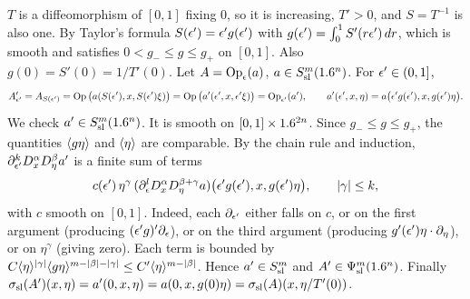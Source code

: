 \subsection*{}
$T$ is a diffeomorphism of $[0,1]$ fixing $0$, so it is increasing, $T'>0$, and
$S=T^{-1}$ is also one. By Taylor's formula $S(\epsilon')=\epsilon'g(\epsilon')$ with
$g(\epsilon')=\int_0^1S'(r\epsilon')\,dr$, which is smooth and satisfies $0<g_-\le g\le g_+$ on $[0,1]$. Also
$g(0)=S'(0)=1/T'(0)$. Let $A=\operatorname{Op}_\epsilon(a)$, $a\in S^{m}_{\mathrm{sl}}(1.6^n)$. For $\epsilon'\in(0,1]$,
\begin{equation*}
A'_{\epsilon'}=A_{S(\epsilon')}=\operatorname{Op}\big(a(S(\epsilon'),x,S(\epsilon')\xi)\big)=\operatorname{Op}\big(a'(\epsilon',x,\epsilon'\xi)\big)=\operatorname{Op}_{\epsilon'}(a'),\qquad
a'(\epsilon',x,\eta)=a\big(\epsilon'g(\epsilon'),x,g(\epsilon')\eta\big).
\end{equation*}
We check $a'\in S^{m}_{\mathrm{sl}}(1.6^n)$. It is smooth on $[0,1]\times1.6^{2n}$. Since $g_-\le g\le g_+$, the
quantities $\langle g\eta\rangle$ and $\langle \eta\rangle$ are comparable. By the chain rule and induction,
$\partial^k_{\epsilon'}D^\alpha_xD^\beta_\eta a'$ is a finite sum of terms
\begin{equation*}
c(\epsilon')\,\eta^\gamma\,(\partial^l_\epsilon D^\alpha_xD^{\beta+\gamma}_\eta a)\big(\epsilon'g(\epsilon'),x,g(\epsilon')\eta\big),\qquad\lvert \gamma\rvert\le k,
\end{equation*}
with $c$ smooth on $[0,1]$. Indeed, each $\partial_{\epsilon'}$ either falls on $c$, or on the first
argument (producing $(\epsilon'g)'\partial_\epsilon$), or on the third argument (producing $g'(\epsilon')\eta\cdot\partial_\eta$),
or on $\eta^\gamma$ (giving zero). Each term is bounded by
$C\langle \eta\rangle^{\lvert \gamma\rvert}\langle g\eta\rangle^{m-\lvert \beta\rvert-\lvert \gamma\rvert}\le C'\langle \eta\rangle^{m-\lvert \beta\rvert}$. Hence $a'\in S^{m}_{\mathrm{sl}}$ and
$A'\in\Psi^{m}_{\mathrm{sl}}(1.6^n)$. Finally
$\sigma_{\mathrm{sl}}(A')(x,\eta)=a'(0,x,\eta)=a(0,x,g(0)\eta)=\sigma_{\mathrm{sl}}(A)(x,\eta/T'(0))$.

